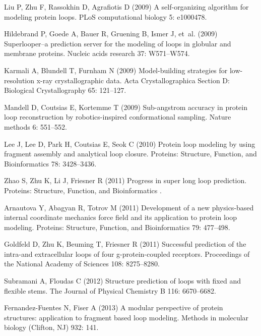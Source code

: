 \begin{thebibliography}{10}
Liu P, Zhu F, Rassokhin D, Agrafiotis D (2009) A self-organizing
algorithm for
  modeling protein loops.
\newblock PLoS computational biology 5: e1000478.

Hildebrand P, Goede A, Bauer R, Gruening B, Ismer J, et~al. (2009)
  Superlooper--a prediction server for the modeling of loops in globular and
  membrane proteins.
\newblock Nucleic acids research 37: W571--W574.

Karmali A, Blundell T, Furnham N (2009) Model-building strategies
for
  low-resolution x-ray crystallographic data.
\newblock Acta Crystallographica Section D: Biological Crystallography 65:
  121--127.

Mandell D, Coutsias E, Kortemme T (2009) Sub-angstrom accuracy in
protein loop
  reconstruction by robotics-inspired conformational sampling.
\newblock Nature methods 6: 551--552.

Lee J, Lee D, Park H, Coutsias E, Seok C (2010) Protein loop
modeling by using
  fragment assembly and analytical loop closure.
\newblock Proteins: Structure, Function, and Bioinformatics 78: 3428--3436.

Zhao S, Zhu K, Li J, Friesner R (2011) Progress in super long loop
prediction.
\newblock Proteins: Structure, Function, and Bioinformatics .

Arnautova Y, Abagyan R, Totrov M (2011) Development of a new
physics-based
  internal coordinate mechanics force field and its application to protein loop
  modeling.
\newblock Proteins: Structure, Function, and Bioinformatics 79: 477--498.

Goldfeld D, Zhu K, Beuming T, Friesner R (2011) Successful
prediction of the
  intra-and extracellular loops of four g-protein-coupled receptors.
\newblock Proceedings of the National Academy of Sciences 108: 8275--8280.

Subramani A, Floudas C (2012) Structure prediction of loops with
fixed and
  flexible stems.
\newblock The Journal of Physical Chemistry B 116: 6670--6682.

Fernandez-Fuentes N, Fiser A (2013) A modular perspective of protein
  structures: application to fragment based loop modeling.
\newblock Methods in molecular biology (Clifton, NJ) 932: 141.


\end{thebibliography}
